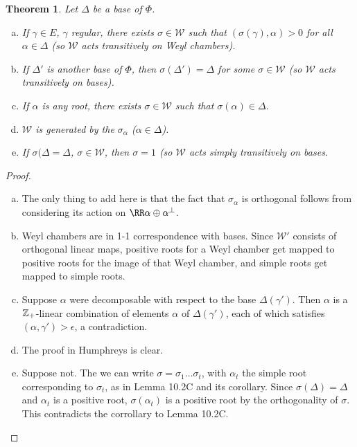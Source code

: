 \documentclass{article}
\newtheorem{thm}{Theorem}[section]
\begin{document}
\begin{thm} Let $\Delta$ be a base of $\Phi$.
\begin{enumerate}[(a)]
\item If $\gamma \in E$, $\gamma$ regular, there exists $\sigma \in \mathcal W$ such that $(\sigma(\gamma), \alpha) > 0$ for all $\alpha \in \Delta$ (so $\mathcal W$ acts transitively on Weyl chambers).
\item If $\Delta'$ is another base of $\Phi$, then $\sigma(\Delta') = \Delta$ for some $\sigma \in \mathcal W$ (so $\mathcal W$ acts transitively on bases).
\item If $\alpha$ is any root, there exists $\sigma \in \mathcal W$ such that $\sigma(\alpha) \in \Delta$.
\item $\mathcal W$ is generated by the $\sigma_\alpha$ ($\alpha \in \Delta$).
\item If $\sigma(\Delta = \Delta$, $\sigma \in \mathcal W$, then $\sigma = 1$ (so $\mathcal W$ acts simply transitively on bases.
\end{enumerate}
\end{thm}
\begin{proof}
\begin{enumerate}[(a)]
\item The only thing to add here is that  the fact that $\sigma_\alpha$ is orthogonal follows from considering its action on $\RR \alpha \oplus \alpha^\perp$.
\item Weyl chambers are in 1-1 correspondence with bases.  Since $\mathcal W'$ consists of orthogonal linear maps,  positive roots for a Weyl chamber get mapped to positive roots for the image of that Weyl chamber, and simple roots get mapped to simple roots.
\item Suppose $\alpha$ were decomposable with respect to the base $\Delta(\gamma')$.  Then $\alpha$ is a $\mathbb{Z}_+$-linear combination of elements $\alpha$ of $\Delta(\gamma')$, each of which satisfies $(\alpha, \gamma') > \epsilon$, a contradiction.
\item The proof in Humphreys is clear.
\item Suppose not.  The we can write $\sigma = \sigma_1 \ldots \sigma_t$, with $\alpha_t$ the simple root corresponding to $\sigma_t$, as in Lemma 10.2C and its corollary.  Since $\sigma(\Delta) = \Delta$ and $\alpha_t$ is a positive root,  $\sigma(\alpha_t)$ is a positive root by the orthogonality of $\sigma$.  This contradicts the corrollary to Lemma 10.2C.
\end{enumerate}
\end{proof}
\end{document}
